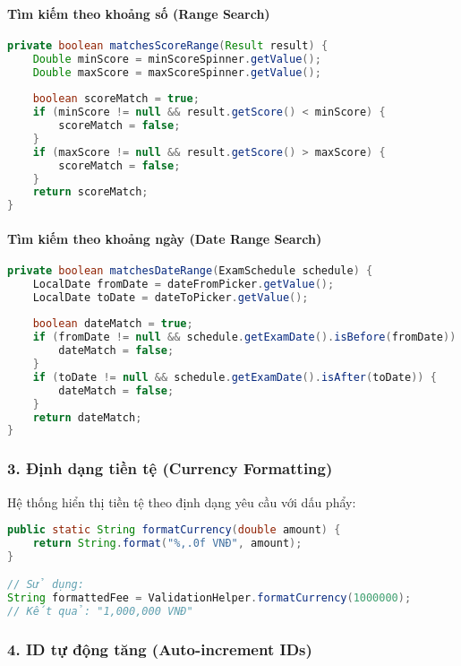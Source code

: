 \documentclass[12pt,a4paper]{article}
\begin{document}
\paragraph{Tìm kiếm theo khoảng số (Range Search)}
\begin{lstlisting}[language=Java, caption=Tìm kiếm theo khoảng điểm]
private boolean matchesScoreRange(Result result) {
    Double minScore = minScoreSpinner.getValue();
    Double maxScore = maxScoreSpinner.getValue();
    
    boolean scoreMatch = true;
    if (minScore != null && result.getScore() < minScore) {
        scoreMatch = false;
    }
    if (maxScore != null && result.getScore() > maxScore) {
        scoreMatch = false;
    }
    return scoreMatch;
}
\end{lstlisting}

\paragraph{Tìm kiếm theo khoảng ngày (Date Range Search)}
\begin{lstlisting}[language=Java, caption=Tìm kiếm theo khoảng thời gian]
private boolean matchesDateRange(ExamSchedule schedule) {
    LocalDate fromDate = dateFromPicker.getValue();
    LocalDate toDate = dateToPicker.getValue();
    
    boolean dateMatch = true;
    if (fromDate != null && schedule.getExamDate().isBefore(fromDate)) {
        dateMatch = false;
    }
    if (toDate != null && schedule.getExamDate().isAfter(toDate)) {
        dateMatch = false;
    }
    return dateMatch;
}
\end{lstlisting}

\subsubsection{3. Định dạng tiền tệ (Currency Formatting)}

Hệ thống hiển thị tiền tệ theo định dạng yêu cầu với dấu phẩy:

\begin{lstlisting}[language=Java, caption=Định dạng tiền tệ]
public static String formatCurrency(double amount) {
    return String.format("%,.0f VNĐ", amount);
}

// Sử dụng:
String formattedFee = ValidationHelper.formatCurrency(1000000);
// Kết quả: "1,000,000 VNĐ"
\end{lstlisting}

\subsubsection{4. ID tự động tăng (Auto-increment IDs)}
\end{document}
